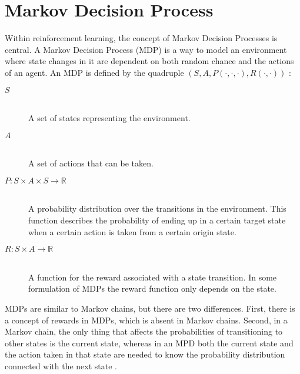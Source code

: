 \section{Markov Decision Process}

Within reinforcement learning, the concept of Markov Decision Processes is central. A Markov Decision Process (MDP) is a way to model an environment where state changes in it are dependent on both random chance and the actions of an agent. An MDP is defined by the quadruple $\left( S, A, P( \cdot , \cdot, \cdot ) , R( \cdot , \cdot ) \right)$ \parencite{altman2002applications}: 

\begin{description}
\item[$S$] \hfill \\ 
    A set of states representing the environment.
\item[$A$] \hfill \\ 
    A set of actions that can be taken.
\item[$P \colon S \times A \times S \to \mathbb R$] \hfill \\ 
    A probability distribution over the transitions in the environment. This function describes the probability of ending up in a certain target state when a certain action is taken from a certain origin state. 
\item[$R \colon S \times A \to \mathbb{R}$] \hfill \\ 
    A function for the reward associated with a state transition. In some formulation of MDPs the reward function only depends on the state.
\end{description}

MDPs are similar to Markov chains, but there are two differences. First, there is a concept of rewards in MDPs, which is absent in Markov chains. Second, in a Markov chain, the only thing that affects the probabilities of transitioning to other states is the current state, whereas in an MPD both the current state and the action taken in that state are needed to know the probability distribution connected with the next state \parencite{altman2002applications}.







